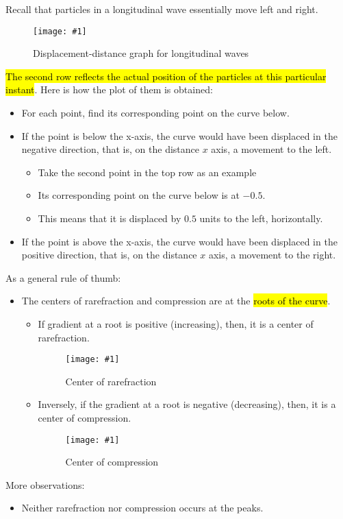 \documentclass[a4paper,12pt]{article}
\newcommand{\img}[4]{\begin{center}
  \begin{figure}[H]
    \centering
    \texttt{[image: \#1]}
    \caption{#3}
    \label{fig:#4}
  \end{figure}
\end{center}}
\begin{document}
Recall that particles in a longitudinal wave essentially move left and right.

\img{dd_long.png}{0.9}{Displacement-distance graph for longitudinal waves}{dd_long}
\hl{The second row reflects the actual position of the particles at this particular instant}. Here is how the plot of them is obtained:
\begin{itemize}
  \item For each point, find its corresponding point on the curve below.
  \item If the point is below the x-axis, the curve would have been displaced in the negative direction, that is, on the distance $x$ axis, a movement to the left.
        \begin{itemize}
          \item  Take the second point in the top row as an example
          \item  Its corresponding point on the curve below is at $-0.5$.
          \item This means that it is displaced by $0.5$ units to the left, horizontally.
        \end{itemize}
  \item If the point is above the x-axis, the curve would have been displaced in the positive direction, that is, on the distance $x$ axis, a movement to the right.
\end{itemize}

\pagebreak

As a general rule of thumb:
\begin{itemize}
  \item The centers of rarefraction and compression are at the \hl{roots of the curve}.
        \begin{itemize}
          \item If gradient at a root is positive (increasing), then, it is a center of rarefraction.
                \img{rarefraction.png}{0.4}{Center of rarefraction}{rarefraction}
          \item Inversely, if the gradient at a root is negative (decreasing), then, it is a center of compression.
                \img{compression.png}{0.4}{Center of compression}{compression}
        \end{itemize}
\end{itemize}
More observations:
\begin{itemize}
  \item Neither rarefraction nor compression occurs at the peaks.
\end{itemize}
\pagebreak
\end{document}
